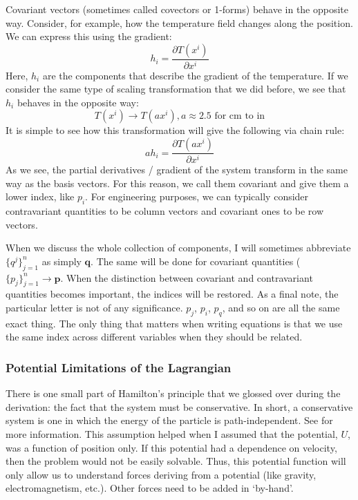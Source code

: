 Covariant vectors (sometimes called covectors or 1-forms) behave in the opposite way. Consider, for example, how the temperature field changes along the position. We can express this using the gradient:
$$h_i=\frac{\partial T(x^i)}{\partial x^i}$$
Here, $h_i$ are the components that describe the gradient of the temperature. If we consider the same type of scaling transformation that we did before, we see that $h_i$ behaves in the opposite way:
$$T(x^i)\rightarrow T(ax^i), a\approx2.5\text{ for cm to in}$$
It is simple to see how this transformation will give the following via chain rule:
$$ah_i=\frac{\partial T(ax^i)}{\partial x^i}$$
As we see, the partial derivatives / gradient of the system transform in the same way as the basis vectors. For this reason, we call them covariant and give them a lower index, like $p_i$.  For engineering purposes, we can typically consider contravariant quantities to be column vectors and covariant ones to be row vectors. 

When we discuss the whole collection of components, I will sometimes abbreviate $\{q^j\}_{j=1}^n$ as simply $\bm{q}$. The same will be done for covariant quantities ($\{p_j\}_{j=1}^n\rightarrow\bm{p}$. When the distinction between covariant and contravariant quantities becomes important, the indices will be restored. As a final note, the particular letter is not of any significance. $p_j$, $p_i$, $p_q$, and so on are all the same exact thing. The only thing that matters when writing equations is that we use the same index across different variables when they should be related.

\subsubsection{Potential Limitations of the Lagrangian}
There is one small part of Hamilton's principle that we glossed over during the derivation: the fact that the system must be \gls{conservative}. In short, a \gls{conservative} system is one in which the energy of the particle is path-independent. See \cite{goldstein_classical_2008} for more information. This assumption helped when I assumed that the potential, $U$, was a function of position only. If this potential had a dependence on velocity, then the problem would not be easily solvable. Thus, this potential function will only allow us to understand forces deriving from a potential (like gravity, electromagnetism, etc.). Other forces need to be added in `by-hand'.

